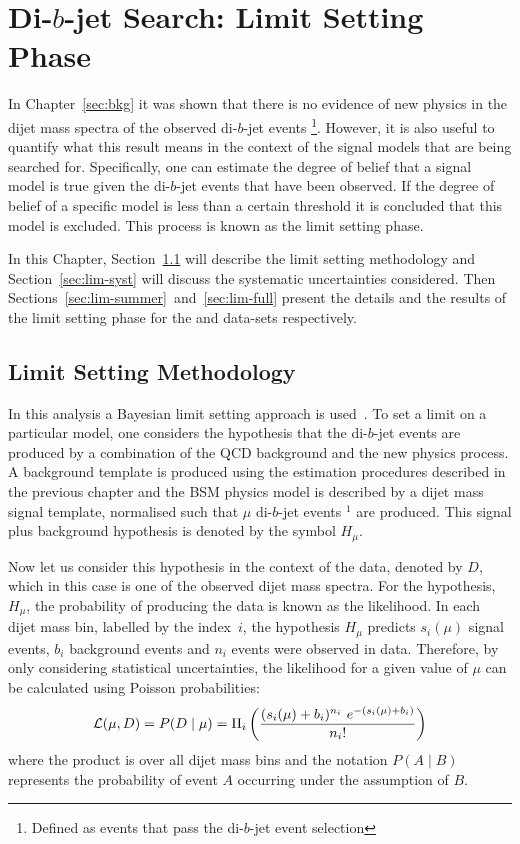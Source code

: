 \chapter{Di-$b$-jet Search: Limit Setting Phase}
\label{sec:lim}

In Chapter~\ref{sec:bkg} it was shown that there is no evidence of new physics in the dijet mass spectra of the observed di-$b$-jet events
\footnote{Defined as events that pass the di-$b$-jet event selection}. %
However, it is also useful to quantify what this result means in the context
of the signal models that are being searched for.
Specifically, one can estimate the degree of belief that a signal model is true given the di-$b$-jet events that have been observed.
If the degree of belief of a specific model is less than a certain threshold it is concluded that this model is excluded.
This process is known as the limit setting phase.

In this Chapter,
Section~\ref{sec:lim-strat} will describe the limit setting methodology and
Section~\ref{sec:lim-syst} will discuss the systematic uncertainties considered.
Then Sections~\ref{sec:lim-summer}~and~\ref{sec:lim-full} present the details and
the results of the limit setting phase for the \summer{} and \lm{} data-sets respectively.

\section{Limit Setting Methodology}
\label{sec:lim-strat}

In this analysis a Bayesian limit setting approach is used~\cite{lim-bayes}.
To set a limit on a particular model, one considers the hypothesis that the di-$b$-jet events
are produced by a combination of the QCD background and the new physics process.
A background template is produced using the estimation procedures described in the previous chapter
and the BSM physics model is described by a dijet mass signal template, normalised such that $\mu$  di-$b$-jet events $^{1}$ are produced.  %
This signal plus background hypothesis is denoted by the symbol $H_\mu$.

Now let us consider this hypothesis in the context of the data, denoted by $D$,
which in this case is one of the observed dijet mass spectra.
For the hypothesis, $H_\mu$, the probability of producing the data is known as the likelihood.
In each dijet mass bin, labelled by the index~$i$, the hypothesis $H_\mu$ predicts
$s_i(\mu)$ signal events, $b_i$ background events and $n_i$ events were observed in data.
Therefore, by only considering statistical uncertainties, the likelihood for a given value of $\mu$ can be calculated using Poisson probabilities:
\begin{equation}
  \mathcal{L} (\mu,D) = P(D \mid \mu) =  \Pi_i \left(\frac{(s_i(\mu)+b_i)^{n_i}~e^{-(s_i(\mu)+b_i)}}{n_i!}\right)
  \label{eqn:lim-like}
\end{equation}
where the product is over all dijet mass bins and
the notation $P(A \mid B)$ represents the probability of event $A$ occurring
under the assumption of $B$.

